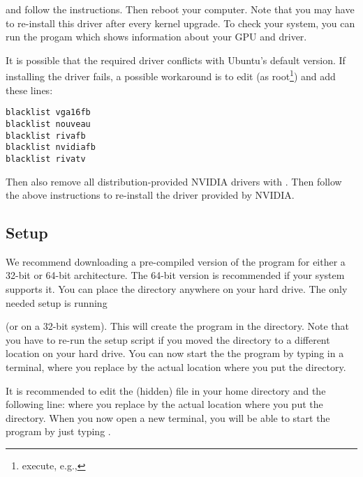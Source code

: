 
and follow the instructions. Then reboot your computer. Note that you may have to re-install this driver after every kernel upgrade. To check your system, you can run the progam  which shows information about your GPU and driver.

It is possible that the required driver conflicts with Ubuntu's default version. If installing the driver fails, a possible workaround is to edit  (as root\footnote{execute, e.g., }) and add these lines:
\small
\begin{verbatim}
blacklist vga16fb
blacklist nouveau
blacklist rivafb
blacklist nvidiafb
blacklist rivatv
\end{verbatim}
\normalsize

Then also remove all distribution-provided \textsc{NVIDIA} drivers with . Then follow the above instructions to re-install the driver provided by \textsc{NVIDIA}.


\subsection{Setup}

We recommend downloading a pre-compiled version of the program for either a 32-bit or 64-bit architecture. The 64-bit version is recommended if your system supports it. You can place the \prog directory anywhere on your hard drive. The only needed setup is running 


(or  on a 32-bit system). This will create the \cmd{\prog} program in the  directory. Note that you have to re-run the setup 
script if you moved the \prog directory to a different location on your hard drive. You can now start the the program by typing  in a terminal, where you replace  by the actual location where you put the \prog directory.

It is recommended to edit the (hidden)  file in your home directory and the following line:  where you replace  by the actual location where you put the \prog directory. When you now open a new terminal, you will be able to start the program by just typing \prog.


